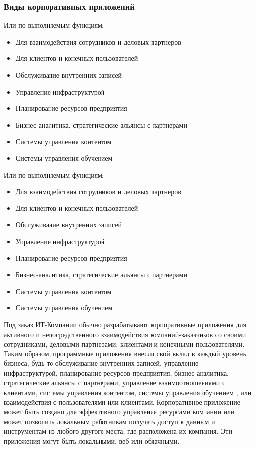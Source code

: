 \documentclass{../industrial-development}
\begin{document}
\begin{frame} \frametitle{Виды корпоративных приложений}
Или по выполняемым функциям:
\begin{itemize}
		\item Для взаимодействия сотрудников и деловых партнеров
		\item Для клиентов и конечных пользователей  
		\item Обслуживание внутренних записей
		\item Управление инфраструктурой
		\item Планирование ресурсов предприятия
		\item Бизнес-аналитика, стратегические альянсы с партнерами
		\item Системы управления контентом
		\item Системы управления обучением 
\end{itemize}
\end{frame}
\lecturenotes
Или по выполняемым функциям:
\begin{itemize}
		\item Для взаимодействия сотрудников и деловых партнеров
		\item Для клиентов и конечных пользователей  
		\item Обслуживание внутренних записей
		\item Управление инфраструктурой
		\item Планирование ресурсов предприятия
		\item Бизнес-аналитика, стратегические альянсы с партнерами
		\item Системы управления контентом
		\item Системы управления обучением 
\end{itemize}
Под заказ ИТ-Компании обычно разрабатывают корпоративные приложения для активного и непосредственного взаимодействия компаний-заказчиков со своими сотрудниками, деловыми партнерами, клиентами и конечными пользователями. Таким образом, программные приложения внесли свой вклад в каждый уровень бизнеса, будь то обслуживание внутренних записей, управление инфраструктурой, планирование ресурсов предприятия, бизнес-аналитика, стратегические альянсы с партнерами, управление взаимоотношениями с клиентами, системы управления контентом, системы управления обучением , или взаимодействия с пользователями или клиентами. Корпоративное приложение может быть создано для эффективного управления ресурсами компании или может позволить локальным работникам получать доступ к данным и инструментам из любого другого места, где расположена их компания. Эти приложения могут быть локальными, веб или облачными.
\end{document}
